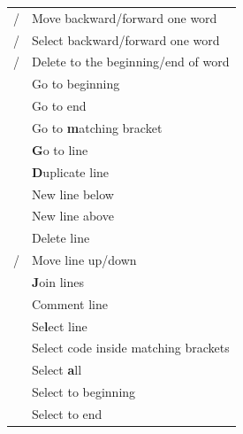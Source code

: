 \documentclass[a4paper]{article}
\newenvironment{keytable}[1]{%
  \begin{tabular}{|>{\rule{0pt}{0.85\normalbaselineskip}}l|l|}
  \hline
  \rowcolor[gray]{.8}
  \multicolumn{2}{|l|}{\bfseries #1}\\ \hline
}{%
  \end{tabular}\par\vspace{5mm}%
}
\begin{document}
\begin{center}
\begin{multicols*}{2}
\begin{keytable}{Editing}
\keys{Ctrl + left} / \keys{right}                          & Move backward/forward one word \\ \hline
\keys{Ctrl + Shift + left} / \keys{right}                  & Select backward/forward one word \\ \hline
\keys{Ctrl + Backspace} / \keys{Del}                       & Delete to the beginning/end of word \\ \hline

\keys{Ctrl + Home}                                         & Go to beginning \\ \hline
\keys{Ctrl + End}                                          & Go to end \\ \hline
\keys{Ctrl + \textbf{m}}                                   & Go to \textbf{m}atching bracket \\ \hline

\keys{Ctrl + \textbf{g}}                                   & \textbf{G}o to line \\ \hline
\keys{Ctrl + Shift + \textbf{d}}                           & \textbf{D}uplicate line \\ \hline
\keys{Ctrl + Enter}                                        & New line below \\ \hline
\keys{Ctrl + Shift + Enter}                                & New line above \\ \hline
\keys{Ctrl + Shift + k}                                    & Delete line \\ \hline
\keys{Ctrl + Up} / \keys{Down}                             & Move line up/down \\ \hline
\keys{Ctrl + \textbf{j}}                                   & \textbf{J}oin lines \\ \hline
\keys{Ctrl + /}                                            & Comment line \\ \hline

\keys{Ctrl + \textbf{l}}                                   & Se\textbf{l}ect line \\ \hline %
\keys{Ctrl + Alt + ,}                                      & Select code inside matching brackets \\ \hline %
\keys{Ctrl + \textbf{a}}                                   & Select \textbf{a}ll \\ \hline
\keys{Ctrl + Shift + Home}                                 & Select to beginning \\ \hline
\keys{Ctrl + Shift + End}                                  & Select to end \\ \hline


\end{keytable}
\end{multicols*}
\end{center}
\end{document}
